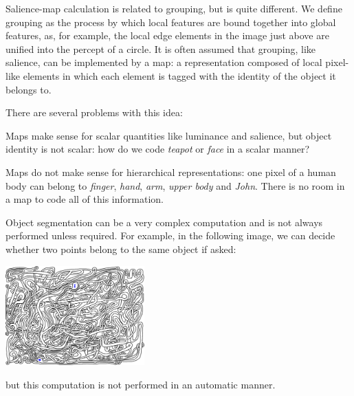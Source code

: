 Salience-map calculation is related to grouping, but is quite different. We define grouping as the process by which local features are bound together into global features, as, for example, the local edge elements in the image just above are unified into the percept of a circle. It is often assumed that grouping, like salience, can be implemented by a map: a representation composed of local pixel-like elements in which each element is tagged with the identity of the object it belongs to.

There are several problems with this idea:

\begin{itemise}
\item Maps make sense for scalar quantities like luminance and salience, but object identity is not scalar: how do we code \emph{teapot} or \emph{face} in a scalar manner?

\item Maps do not make sense for hierarchical representations: one pixel of a human body can belong to \emph{finger}, \emph{hand}, \emph{arm}, \emph{upper body} and \emph{John}. There is no room in a map to code all of this information.

\item Object segmentation can be a very complex computation and is not always performed unless required. For example, in the following image, we can decide whether two points belong to the same object if asked:

\begin{center}
\includegraphics[width=0.4\textwidth]{img/maze.png}
\end{center}

but this computation is not performed in an automatic manner.

\end{itemise}